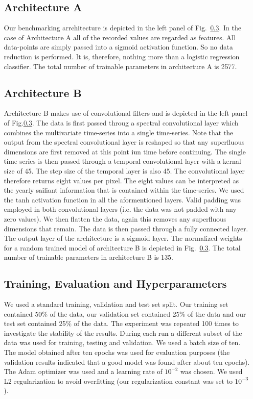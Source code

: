 \documentclass{article}
\begin{document}
\subsection{Architecture A}
Our benchmarking arrchitecture is depicted in the left panel of Fig.~\ref{}. In the case of Architecture A all of the recorded values are regarded as features. All data-points are simply passed into a sigmoid activation function. So no data reduction is performed. It is, therefore,  nothing more than a logistic regression classifier.
The total number of trainable parameters in architecture A is 2577.

\subsection{Architecture B}
Architecture B makes use of convolutional filters and is depicted in the left panel of Fig.\ref{}. The data is first passed throug a spectral convolutional layer which combines the multivariate time-series into a single time-series. Note that the output from the spectral convolutional layer is reshaped so that any superfluous dimensions are first removed at this point iun time before continuing. The single time-series is then passed through a temporal convolutional layer with a kernal size of 45. The step size of the temporal layer is also 45. The convolutional layer therefore returns eight values per pixel. The eight values can be interpreted as the yearly sailiant information that is contained within the time-series. We used the tanh activation function in all the aformentioned layers. Valid padding was employed in both convolutional layers (i.e. the data was not padded with any zero values). We then flatten the data, again this removes any superfluous dimensions that remain. The data is then passed through a fully connected layer. The output layer of the architecture is a sigmoid layer. The normalized weights for a random trained model of architecture B is depicted in Fig.~\ref{}. The total number of trainable parameters in architecture B is 135.
     

\subsection{Training, Evaluation and Hyperparameters}

We used a standard training, validation and test set split. Our training set contained 50\% of the data, our validation set contained 25\% of the data and our test set contained 25\% of the data. The experiment was repeated 100 times to investigate the stability of the results. During each run a different subset of the data was used for training, testing and validation. We used a batch size of ten. The model obtained after ten epochs was used for evaluation purposes (the validation results indicated that a good model was found after about ten epochs). The Adam optimizer was used and a learning rate of $10^{-2}$ was chosen. We used L2 regularization to avoid overfitting (our regularization constant was set to $10^{-3}$).    
\end{document}

